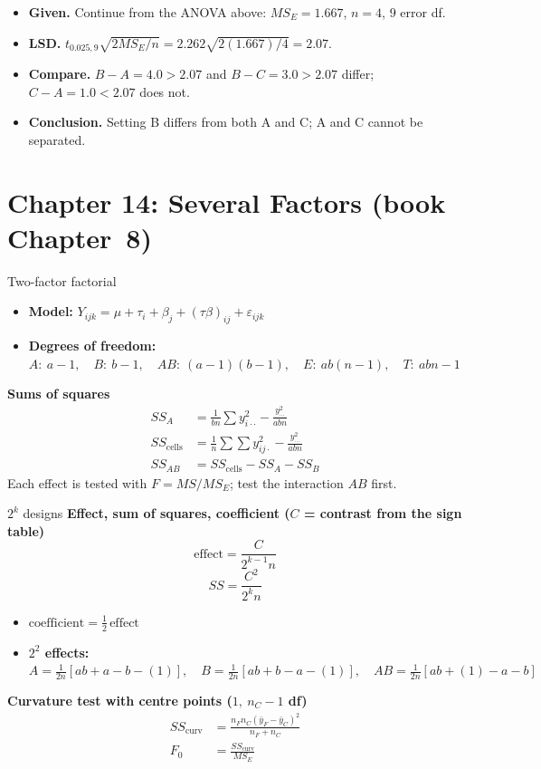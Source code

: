 \begin{example}
\begin{itemize}
  \item \textbf{Given.} Continue from the ANOVA above: $MS_E=1.667$, $n=4$, $9$ error df.
  \item \textbf{LSD.} $t_{0.025,9}\sqrt{2MS_E/n}=2.262\sqrt{2(1.667)/4}=2.07$.
  \item \textbf{Compare.} $B-A=4.0>2.07$ and $B-C=3.0>2.07$ differ; $C-A=1.0<2.07$ does not.
  \item \textbf{Conclusion.} Setting B differs from both A and C; A and C cannot be separated.
\end{itemize}
\end{example}

\section{Chapter 14: Several Factors (book Chapter~8)}

\begin{formulabox}{Two-factor factorial}
\begin{itemize}
  \item \textbf{Model:} $Y_{ijk}=\mu+\tau_i+\beta_j+(\tau\beta)_{ij}+\varepsilon_{ijk}$
  \item \textbf{Degrees of freedom:} $A:\ a-1,\quad B:\ b-1,\quad AB:\ (a-1)(b-1),\quad E:\ ab(n-1),\quad T:\ abn-1$
\end{itemize}
\textbf{Sums of squares}
\[ \begin{aligned}SS_A&=\frac1{bn}\sum y_{i\cdot\cdot}^2-\frac{y_{\cdots}^2}{abn}\\[4pt] SS_{\text{cells}}&=\frac1n\sum\sum y_{ij\cdot}^2-\frac{y_{\cdots}^2}{abn}\\[4pt] SS_{AB}&=SS_{\text{cells}}-SS_A-SS_B\end{aligned} \]
Each effect is tested with $F=MS/MS_E$; test the interaction $AB$ first.
\end{formulabox}

\begin{formulabox}{$2^k$ designs}
\textbf{Effect, sum of squares, coefficient ($C$ = contrast from the sign table)}
\[ \text{effect}=\frac{C}{2^{k-1}n} \]
\[ SS=\frac{C^2}{2^kn} \]
\begin{itemize}
  \item $\text{coefficient}=\tfrac12\,\text{effect}$
  \item \textbf{$2^2$ effects:} $A=\tfrac1{2n}[ab+a-b-(1)],\quad B=\tfrac1{2n}[ab+b-a-(1)],\quad AB=\tfrac1{2n}[ab+(1)-a-b]$
\end{itemize}
\textbf{Curvature test with centre points ($1,\ n_C-1$ df)}
\[ \begin{aligned}SS_{\text{curv}}&=\frac{n_Fn_C(\bar{y}_F-\bar{y}_C)^2}{n_F+n_C}\\[4pt] F_0&=\frac{SS_{\text{curv}}}{MS_E}\end{aligned} \]
\end{formulabox}

